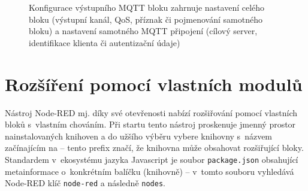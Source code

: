\begin{figure}%
    \centering
    \hfill
    \caption{%
    Konfigurace výstupního MQTT bloku zahrnuje nastavení celého bloku (výstupní kanál, QoS, příznak 
    či pojmenování samotného bloku) a nastavení samotného MQTT připojení (cílový server, identifikace klienta či
    autentizační údaje)
    }%
    \label{fig:node-red-mqtt-out-conf}
\end{figure}


\section{Rozšíření pomocí vlastních modulů}\label{sec:node-red-rozsireni}

Nástroj Node-RED mj. díky své otevřenosti nabízí rozšiřování pomocí vlastních bloků s~vlastním chováním.
Při startu tento nástroj proskenuje jmenný prostor nainstalovaných knihoven a do užšího výběru vybere
knihovny s~názvem začínajícím na {} -- tento prefix značí, že knihovna může obsahovat
rozšiřující bloky. %
Standardem v~ekosystému jazyka Javascript je soubor \texttt{package.json} obsahující metainformace o~konkrétním
balíčku (knihovně) -- v~tomto souboru vyhledává Node-RED klíč \texttt{node-red} a následně \texttt{nodes}.

